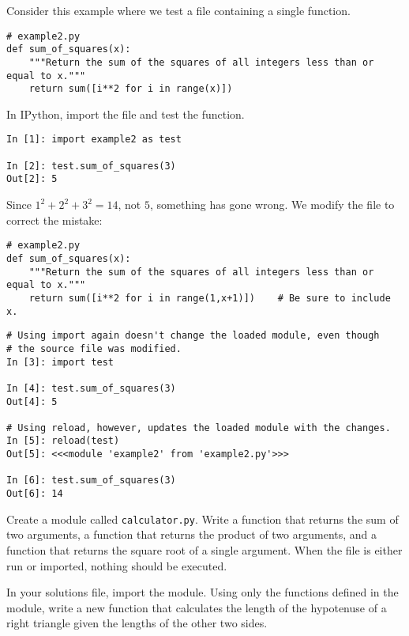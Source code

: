 Consider this example where we test a file containing a single function.
\begin{lstlisting}
# example2.py
def sum_of_squares(x):
    """Return the sum of the squares of all integers less than or equal to x."""
    return sum([i**2 for i in range(x)])
\end{lstlisting}

In IPython, import the file and test the  function.
\begin{lstlisting}
In [1]: import example2 as test

In [2]: test.sum_of_squares(3)
Out[2]: 5
\end{lstlisting}

Since $1^2 + 2^2 + 3^2 = 14$, not $5$, something has gone wrong.
We modify the file to correct the mistake:

\begin{lstlisting}
# example2.py
def sum_of_squares(x):
    """Return the sum of the squares of all integers less than or equal to x."""
    return sum([i**2 for i in range(1,x+1)])    # Be sure to include x.
\end{lstlisting}

\begin{lstlisting}
# Using import again doesn't change the loaded module, even though
# the source file was modified.
In [3]: import test

In [4]: test.sum_of_squares(3)
Out[4]: 5

# Using reload, however, updates the loaded module with the changes.
In [5]: reload(test)
Out[5]: <<<module 'example2' from 'example2.py'>>>

In [6]: test.sum_of_squares(3)
Out[6]: 14
\end{lstlisting}

\begin{problem}
Create a module called \texttt{calculator.py}.
Write a function that returns the sum of two arguments, a function that returns the product of two arguments, and a function that returns the square root of a single argument.
When the file is either run or imported, nothing should be executed.

In your solutions file, import the  module.
Using only the functions defined in the module, write a new function that calculates the length of the hypotenuse of a right triangle given the lengths of the other two sides.
\end{problem}

